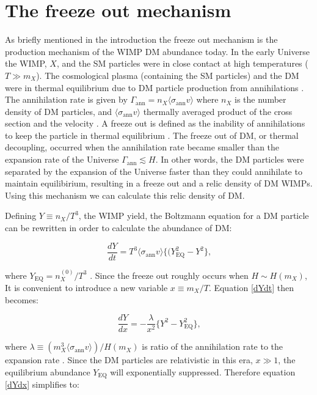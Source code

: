 \section{The freeze out mechanism}\label{2}

As briefly mentioned in the introduction the freeze out mechanism is the production mechanism of the WIMP DM abundance today. In the early Universe the WIMP, $X$, and the SM particles were in close contact at high temperatures ($T \gg m_X$). The cosmological plasma (containing the SM particles) and the DM were in thermal equilibrium due to DM particle production from annihilations \cite{Roszkowski:2017nbc}. The annihilation rate is given by $\Gamma_{\text{ann}} = n_X \langle \sigma_{\text{ann}} v \rangle$ where $n_X$ is the number density of DM particles, and  $\langle \sigma_{\text{ann}} v \rangle$ thermally averaged product of the cross section and the velocity \cite{Profumo:2013yn}. A freeze out is defined as the inability of annihilations to keep the particle in thermal equilibrium \cite{Dodelson:2003ft}. The freeze out of DM, or thermal decoupling, occurred when the annihilation rate became smaller than the expansion rate of the Universe $\Gamma_{\text{ann}} \lesssim H$. In other words, the DM particles were separated by the expansion of the Universe faster than they could annihilate to maintain equilibirium, resulting in a freeze out and a relic density of DM WIMPs. Using this mechanism we can calculate this relic density of DM. 

Defining $Y \equiv n_X/T^3$, the WIMP yield, the Boltzmann equation for a DM particle can be rewritten in order to calculate the abundance of DM:

\begin{equation}\label{dYdt}
\frac{dY}{dt} = T^3 \langle \sigma_{\text{ann}} v \rangle \{(Y_{\text{EQ}}^2 - Y^2\} \text{,}
\end{equation}

where $Y_{\text{EQ}} = n^{(0)}_X/T^3$  \cite{Dodelson:2003ft}. Since the freeze out roughly occurs when $H \sim H(m_X)$, It is convenient to introduce a new variable $x \equiv m_X/T$. Equation \ref{dYdt} then becomes:

\begin{equation}\label{dYdx}
\frac{dY}{dx} = -  \frac{\lambda}{x^2}\{Y^2 - Y_{\text{EQ}}^2\} \text{,}
\end{equation}

where $\lambda \equiv (m_X^3 \langle \sigma_{\text{ann}} v \rangle)/H(m_X)$ is ratio of the annihilation rate to the expansion rate \cite{Dodelson:2003ft}. Since the DM particles are relativistic in this era, $ x \gg 1$, the equilibrium abundance $Y_{\text{EQ}}$ will exponentially suppressed. Therefore equation \ref{dYdx} simplifies to:

